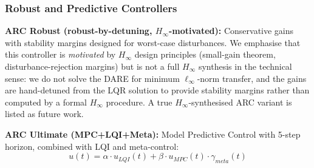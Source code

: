 \documentclass{article}
\begin{document}
\subsubsection{Robust and Predictive Controllers}

\textbf{ARC Robust (robust-by-detuning, $H_\infty$-motivated):} Conservative gains with stability margins designed for worst-case disturbances. We emphasise that this controller is \emph{motivated} by $H_\infty$ design principles (small-gain theorem, disturbance-rejection margins) but is not a full $H_\infty$ synthesis in the technical sense: we do not solve the DARE for minimum $\ell_\infty$-norm transfer, and the gains are hand-detuned from the LQR solution to provide stability margins rather than computed by a formal $H_\infty$ procedure. A true $H_\infty$-synthesised ARC variant is listed as future work.

\textbf{ARC Ultimate (MPC+LQI+Meta):} Model Predictive Control with 5-step horizon, combined with LQI and meta-control:
\begin{equation}
u(t) = \alpha \cdot u_{LQI}(t) + \beta \cdot u_{MPC}(t) \cdot \gamma_{meta}(t)
\end{equation}
\end{document}
